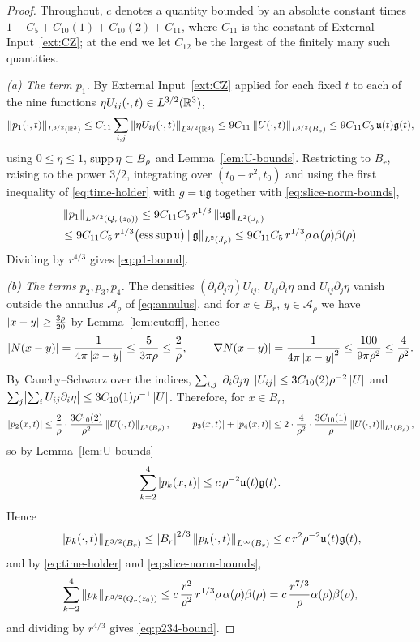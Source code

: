 \documentclass[11pt,reqno]{amsart}
\begin{document}
\begin{proof}
Throughout, $c$ denotes a quantity bounded by an absolute constant times
$1+C_{5}+C_{10}(1)+C_{10}(2)+C_{11}$, where $C_{11}$ is the constant of
External Input~\ref{ext:CZ}; at the end we let $C_{12}$ be the largest of the
finitely many such quantities.

\emph{(a) The term $p_{1}$.} By External Input~\ref{ext:CZ} applied for each
fixed $t$ to each of the nine functions $\eta U_{ij}(\cdot,t)\in L^{3/2}(\mathbb{R}^{3})$,
\[
  \left\lVert p_{1}(\cdot,t) \right\rVert_{L^{3/2}(\mathbb{R}^{3})}
  \le C_{11}\sum_{i,j}\left\lVert \eta U_{ij}(\cdot,t) \right\rVert_{L^{3/2}(\mathbb{R}^{3})}
  \le 9C_{11}\left\lVert U(\cdot,t) \right\rVert_{L^{3/2}(B_{\rho})}
  \le 9C_{11}C_{5}\,\mathfrak{u}(t)\mathfrak{g}(t),
\]
using $0\le\eta\le1$, $\operatorname{supp}\eta\subset B_{\rho}$ and
Lemma~\ref{lem:U-bounds}. Restricting to $B_{r}$, raising to the power $3/2$,
integrating over $(t_{0}-r^{2},t_{0})$ and using the first inequality of
\eqref{eq:time-holder} with $g=\mathfrak{u}\mathfrak{g}$ together with
\eqref{eq:slice-norm-bounds},
\[\begin{aligned}
  &\left\lVert p_{1} \right\rVert_{L^{3/2}(Q_{r}(z_{0}))}
  \le 9C_{11}C_{5}\,r^{1/3}\left\lVert \mathfrak{u}\mathfrak{g} \right\rVert_{L^{2}(J_{\rho})}
  \\ &\le 9C_{11}C_{5}\,r^{1/3}\bigl(\operatorname*{ess\,sup}\mathfrak{u}\bigr)
      \left\lVert \mathfrak{g} \right\rVert_{L^{2}(J_{\rho})}
  \le 9C_{11}C_{5}\,r^{1/3}\rho\,\alpha(\rho)\beta(\rho).
\end{aligned}\]
Dividing by $r^{4/3}$ gives \eqref{eq:p1-bound}.

\emph{(b) The terms $p_{2},p_{3},p_{4}$.} The densities
$(\partial_{i}\partial_{j}\eta)U_{ij}$, $U_{ij}\partial_{i}\eta$ and
$U_{ij}\partial_{j}\eta$ vanish outside the annulus $\mathcal{A}_{\rho}$ of
\eqref{eq:annulus}, and for $x\in B_{r}$, $y\in\mathcal{A}_{\rho}$ we have
$\left\lvert x-y \right\rvert\ge\tfrac{3\rho}{20}$ by Lemma~\ref{lem:cutoff}, hence
\[
  \left\lvert N(x-y) \right\rvert=\frac{1}{4\pi\left\lvert x-y \right\rvert}\le\frac{5}{3\pi\rho}\le\frac2\rho,
  \qquad
  \left\lvert \nabla N(x-y) \right\rvert=\frac{1}{4\pi\left\lvert x-y \right\rvert^{2}}
    \le\frac{100}{9\pi\rho^{2}}\le\frac4{\rho^{2}} .
\]
By Cauchy--Schwarz over the indices,
$\sum_{i,j}\left\lvert \partial_{i}\partial_{j}\eta \right\rvert\left\lvert U_{ij} \right\rvert\le3C_{10}(2)\rho^{-2}\left\lvert U \right\rvert$
and $\sum_{j}\bigl|\sum_{i}U_{ij}\partial_{i}\eta\bigr|
 \le3C_{10}(1)\rho^{-1}\left\lvert U \right\rvert$. Therefore, for $x\in B_{r}$,
\[
  \left\lvert p_{2}(x,t) \right\rvert\le\frac2\rho\cdot\frac{3C_{10}(2)}{\rho^{2}}
     \left\lVert U(\cdot,t) \right\rVert_{L^{1}(B_{\rho})},
  \qquad
  \left\lvert p_{3}(x,t) \right\rvert+\left\lvert p_{4}(x,t) \right\rvert\le2\cdot\frac{4}{\rho^{2}}\cdot
     \frac{3C_{10}(1)}{\rho}\left\lVert U(\cdot,t) \right\rVert_{L^{1}(B_{\rho})} ,
\]
so by Lemma~\ref{lem:U-bounds}
\[
\sum_{k=2}^{4}\left\lvert p_{k}(x,t) \right\rvert\le c\,\rho^{-2}\mathfrak{u}(t)\mathfrak{g}(t)
.
\]
Hence
\[
\left\lVert p_{k}(\cdot,t) \right\rVert_{L^{3/2}(B_{r})}\le\left\lvert B_{r} \right\rvert^{2/3}
 \left\lVert p_{k}(\cdot,t) \right\rVert_{L^{\infty}(B_{r})}
 \le c\,r^{2}\rho^{-2}\mathfrak{u}(t)\mathfrak{g}(t)
,
\] and by
\eqref{eq:time-holder} and \eqref{eq:slice-norm-bounds},
\[
  \sum_{k=2}^{4}\left\lVert p_{k} \right\rVert_{L^{3/2}(Q_{r}(z_{0}))}
  \le c\,\frac{r^{2}}{\rho^{2}}\,r^{1/3}\rho\,\alpha(\rho)\beta(\rho)
  = c\,\frac{r^{7/3}}{\rho}\alpha(\rho)\beta(\rho),
\]
and dividing by $r^{4/3}$ gives \eqref{eq:p234-bound}.


\end{proof}
\end{document}

